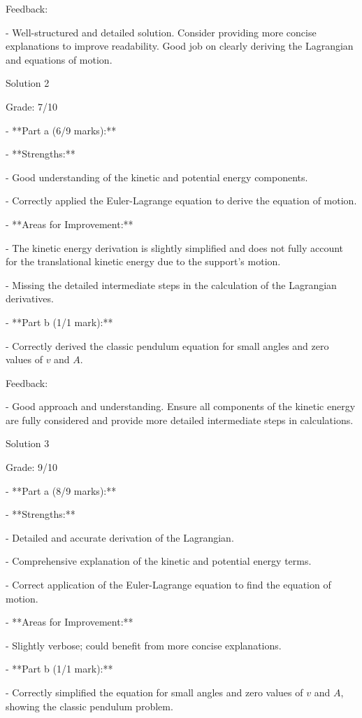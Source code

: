 \documentclass[a4paper,11pt]{article}
\begin{document}
Feedback:

- Well-structured and detailed solution. Consider providing more concise explanations to improve readability. Good job on clearly deriving the Lagrangian and equations of motion.

Solution 2

Grade: 7/10

- **Part a (6/9 marks):** 

  - **Strengths:**
  
    - Good understanding of the kinetic and potential energy components.
    
    - Correctly applied the Euler-Lagrange equation to derive the equation of motion.
    
  - **Areas for Improvement:**
  
    - The kinetic energy derivation is slightly simplified and does not fully account for the translational kinetic energy due to the support's motion.
    
    - Missing the detailed intermediate steps in the calculation of the Lagrangian derivatives.
    
- **Part b (1/1 mark):** 

  - Correctly derived the classic pendulum equation for small angles and zero values of \( v \) and \( A \).

Feedback:

- Good approach and understanding. Ensure all components of the kinetic energy are fully considered and provide more detailed intermediate steps in calculations.

Solution 3

Grade: 9/10

- **Part a (8/9 marks):** 

  - **Strengths:**
  
    - Detailed and accurate derivation of the Lagrangian.
    
    - Comprehensive explanation of the kinetic and potential energy terms.
    
    - Correct application of the Euler-Lagrange equation to find the equation of motion.
    
  - **Areas for Improvement:**
  
    - Slightly verbose; could benefit from more concise explanations.
    
- **Part b (1/1 mark):** 

  - Correctly simplified the equation for small angles and zero values of \( v \) and \( A \), showing the classic pendulum problem.
\end{document}

